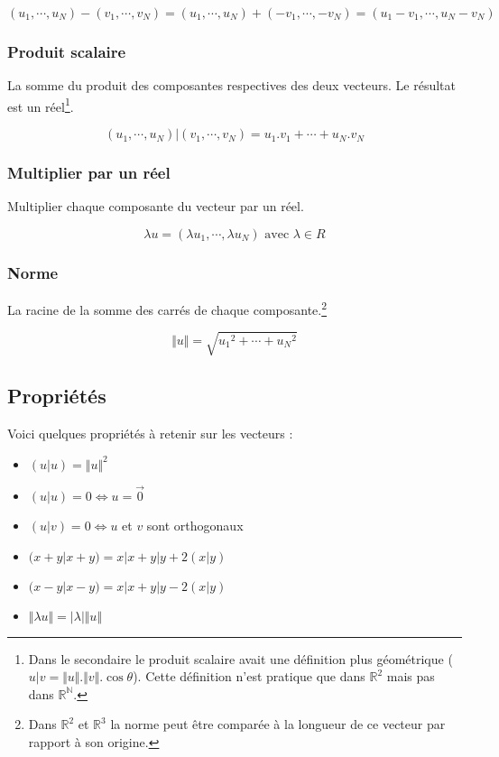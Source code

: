 \documentclass[a4paper,10pt]{report}
\begin{document}
$$(u_1, \cdots, u_N) - (v_1, \cdots, v_N) = (u_1, \cdots, u_N) + (-v_1,\cdots,-v_N) = (u_1 - v_1, \cdots, u_N -v_N)$$ 

\subsubsection{Produit scalaire}
La somme du produit des composantes respectives des deux vecteurs. Le résultat est un réel\footnote{Dans le secondaire le produit scalaire avait une définition plus géométrique ($u|v = \Vert u \Vert . \Vert v \Vert . \cos \theta$). Cette définition n'est pratique que dans $\mathbb{R}^2$ mais pas dans $\mathbb{R^N}$.}.

$$(u_1, \cdots, u_N) | (v_1, \cdots, v_N) = u_1.v_1 + \cdots + u_N.v_N$$

\subsubsection{Multiplier par un réel}
Multiplier chaque composante du vecteur par un réel.

$$\lambda u = (\lambda u_1, \cdots, \lambda u_N) \mbox{ avec } \lambda \in R$$

\subsubsection{Norme}
La racine de la somme des carrés de chaque composante.\footnote{Dans $\mathbb{R}^2$ et $\mathbb{R}^3$ la norme peut être comparée à la longueur de ce vecteur par rapport à son origine.}

$$\Vert u \Vert = \sqrt{{u_1}^2+\cdots+{u_N}^2}$$

\subsection {Propriétés}

Voici quelques propriétés à retenir sur les vecteurs :

\begin{itemize}
\item{$(u|u)={\Vert u \Vert}^2$}
\item{$(u|u)=0 \Leftrightarrow u = \vec 0$}
\item{$(u|v)=0 \Leftrightarrow u$ et $v$ sont orthogonaux}
\item{$(x+y|x+y) = x|x + y|y + 2(x|y)$}
\item{$(x-y|x-y) = x|x + y|y - 2(x|y)$}
\item{$\Vert \lambda u \Vert = \vert \lambda \vert \Vert u \Vert$}
\end{itemize}
\end{document}
